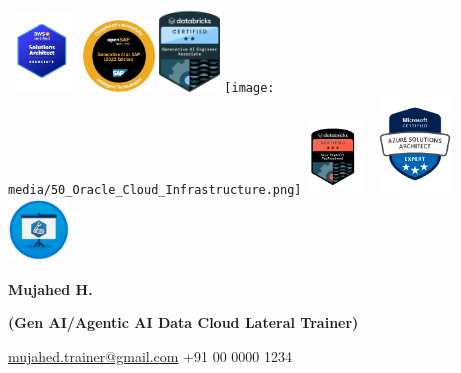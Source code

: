 \documentclass[a4paper]{article}
\begin{document}
\includegraphics[width=0.73668in,height=0.81548in]{media/image1.png}
\includegraphics[width=0.74287in,height=0.74561in]{media/image2.jpeg}
\includegraphics[width=0.62821in,height=0.87111in]{media/image3.png}
\texttt{[image: media/50\_Oracle\_Cloud\_Infrastructure.png]}
\includegraphics[width=0.60088in,height=0.8017in]{media/image5.png}
\includegraphics[width=0.99074in,height=1.01661in]{media/image6.png}
\includegraphics[width=0.65064in,height=0.65064in]{media/image7.png}

\begin{center}
  {\large \textbf{Mujahed H.}}\\[0.2cm]
\end{center}
\begin{center}
  \textbf{(Gen AI/Agentic AI Data Cloud Lateral Trainer)}
\end{center}
\begin{center}
  \href{mailto:mujahed.trainer@gmail.com}{mujahed.trainer@gmail.com} \textbar{} +91 00 0000 1234
\end{center}
\end{document}
